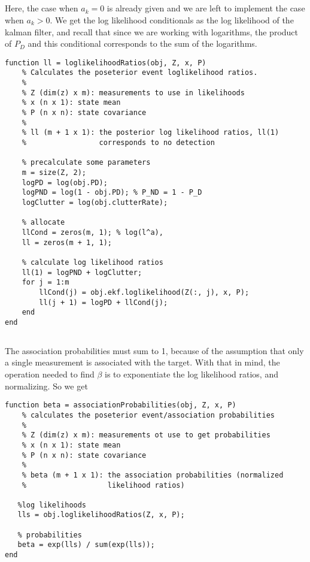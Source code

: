 \documentclass[]{article}
\begin{document}
\subsection{}
Here, the case when $a_k = 0$ is already given and we are left to implement the case when $a_k > 0$. We get the log likelihood conditionals as the log likelihood of the kalman filter, and recall that since we are working with logarithms, the product of $P_D$ and this conditional corresponds to the sum of the logarithms.
\begin{lstlisting}[caption={PDAF log likelihood ratios}]
function ll = loglikelihoodRatios(obj, Z, x, P)
    % Calculates the poseterior event loglikelihood ratios.
    %
    % Z (dim(z) x m): measurements to use in likelihoods
    % x (n x 1): state mean
    % P (n x n): state covariance
    %
    % ll (m + 1 x 1): the posterior log likelihood ratios, ll(1)
    %                 corresponds to no detection

    % precalculate some parameters
    m = size(Z, 2);
    logPD = log(obj.PD);
    logPND = log(1 - obj.PD); % P_ND = 1 - P_D
    logClutter = log(obj.clutterRate);

    % allocate
    llCond = zeros(m, 1); % log(l^a),
    ll = zeros(m + 1, 1);

    % calculate log likelihood ratios
    ll(1) = logPND + logClutter;
    for j = 1:m
        llCond(j) = obj.ekf.loglikelihood(Z(:, j), x, P);
        ll(j + 1) = logPD + llCond(j);
    end
end
\end{lstlisting}

\subsection{}
The association probabilities must sum to 1, because of the assumption that only a single measurement is associated with the target. With that in mind, the operation needed to find $\beta$ is to exponentiate the log likelihood ratios, and normalizing. So we get

\begin{lstlisting}[caption={PDAF assiciation probabilities}]
function beta = associationProbabilities(obj, Z, x, P)
    % calculates the poseterior event/association probabilities
    %
    % Z (dim(z) x m): measurements ot use to get probabilities
    % x (n x 1): state mean
    % P (n x n): state covariance
    %
    % beta (m + 1 x 1): the association probabilities (normalized
    %                   likelihood ratios)

   %log likelihoods
   lls = obj.loglikelihoodRatios(Z, x, P);

   % probabilities
   beta = exp(lls) / sum(exp(lls));
end
\end{lstlisting}
\end{document}
